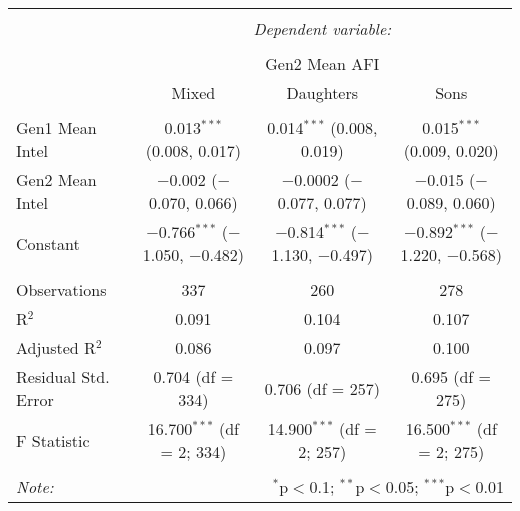 
\begingroup 
\small 
\begin{tabular}{@{\extracolsep{1pt}}lccc} 
\\[-1.8ex]\hline 
\hline \\[-1.8ex] 
 & \multicolumn{3}{c}{\textit{Dependent variable:}} \\ 
\cline{2-4} 
\\[-1.8ex] & \multicolumn{3}{c}{Gen2 Mean AFI} \\ 
 & Mixed & Daughters & Sons \\ 
\hline \\[-1.8ex] 
 Gen1 Mean Intel & 0.013$^{***}$ (0.008, 0.017) & 0.014$^{***}$ (0.008, 0.019) & 0.015$^{***}$ (0.009, 0.020) \\ 
  Gen2 Mean Intel & $-$0.002 ($-$0.070, 0.066) & $-$0.0002 ($-$0.077, 0.077) & $-$0.015 ($-$0.089, 0.060) \\ 
  Constant & $-$0.766$^{***}$ ($-$1.050, $-$0.482) & $-$0.814$^{***}$ ($-$1.130, $-$0.497) & $-$0.892$^{***}$ ($-$1.220, $-$0.568) \\ 
 \hline \\[-1.8ex] 
Observations & 337 & 260 & 278 \\ 
R$^{2}$ & 0.091 & 0.104 & 0.107 \\ 
Adjusted R$^{2}$ & 0.086 & 0.097 & 0.100 \\ 
Residual Std. Error & 0.704 (df = 334) & 0.706 (df = 257) & 0.695 (df = 275) \\ 
F Statistic & 16.700$^{***}$ (df = 2; 334) & 14.900$^{***}$ (df = 2; 257) & 16.500$^{***}$ (df = 2; 275) \\ 
\hline 
\hline \\[-1.8ex] 
\textit{Note:}  & \multicolumn{3}{r}{$^{*}$p$<$0.1; $^{**}$p$<$0.05; $^{***}$p$<$0.01} \\ 
\end{tabular} 
\endgroup 
